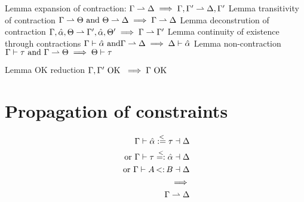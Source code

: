 \documentclass{report}
\begin{document}
Lemma expansion of contraction: $\Gamma \rightharpoonup \Delta \implies \Gamma,\Gamma' \rightharpoonup \Delta,\Gamma'$
Lemma transitivity of contraction $\Gamma \rightharpoonup \Theta \text{ and } \Theta \rightharpoonup \Delta \implies \Gamma \rightharpoonup \Delta$
Lemma deconstrution of contraction $\Gamma,\hat{\alpha},\Theta \rightharpoonup \Gamma',\hat{\alpha},\Theta' \implies \Gamma \rightharpoonup \Gamma'$
Lemma continuity of existence through contractions $\Gamma \vdash \hat{\alpha} \text{ and} \Gamma \rightharpoonup \Delta \implies \Delta \vdash \hat{\alpha}$
Lemma non-contraction $\Gamma \vdash \tau \text{ and } \Gamma \rightharpoonup \Theta \implies \Theta \vdash \tau$

Lemma OK reduction $\Gamma,\Gamma' \text{ OK } \implies \Gamma \text{ OK }$

\section{Propagation of constraints}
\begin{align*}
\Gamma \vdash \alphahat \instl \tau \dashv \Delta\\
\text{ or }\Gamma \vdash \tau \instr \alphahat \dashv \Delta\\
\text{ or }\Gamma \vdash A \st B \dashv \Delta\\
\implies\\
\Gamma \contracts \Delta\\
\end{align*}
\end{document}
